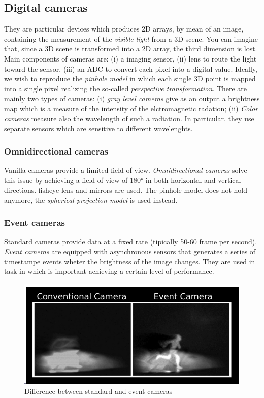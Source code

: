 \subsection{Digital cameras}
They are particular devices which produces 2D arrays, by mean of an image, containing the measurement of the \textit{visible light} from a 3D scene. You can imagine that, since a 3D scene is transformed into a 2D array, the third dimension is lost. Main components of cameras are: (i) a imaging sensor, (ii) lens to route the light toward the sensor, (iii) an ADC to convert each pixel into a digital value. Ideally, we wish to reproduce the \textit{pinhole model} in which each single 3D point is mapped into a single pixel realizing the so-called \textit{perspective transformation}. There are mainly two types of cameras: (i) \textit{gray level cameras} give as an output a brightness map which is a  measure of the intensity of the elctromagnetic radation; (ii) \textit{Color cameras} measure also the wavelength of such a radiation. In particular, they use separate sensors which are sensitive to different wavelenghts.


\subsubsection{Omnidirectional cameras}
Vanilla cameras provide a limited field of view. \textit{Omnidirectional cameras} solve this issue by achieving a field of view of 180° in both horizontal and vertical directions. \textsf{fisheye lens and mirrors} are used. The pinhole model does not hold anymore, the \textit{spherical projection model} is used instead.

\subsubsection{Event cameras}
Standard cameras provide data at a fixed rate (tipically 50-60 frame per second). \textit{Event cameras} are equipped with \underline{asynchronous sensors} that generates a series of timestampe events wheter the brightness of the image changes. They are used in task in which is important achieving a certain level of performance.

\begin{figure}
    \centering
    \includegraphics[scale=0.7]{img/event_cameras.png}
    \caption{Difference between standard and event cameras}
\end{figure}

